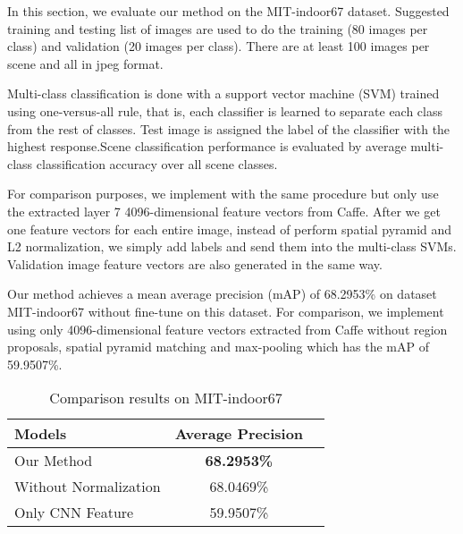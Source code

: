
In this section, we evaluate our method on the MIT-indoor67 dataset. Suggested training and
testing list of images are used to do the training (80 images per class)
and validation (20 images per class). There are at least 100 images per
scene and all in jpeg format.

Multi-class classification is done with a support vector machine (SVM) trained
using one-versus-all rule, that is, each classifier is learned to separate each
class from the rest of classes. Test image is assigned the label of the
classifier with the highest response.Scene classification performance is
evaluated by average multi-class classification accuracy over all scene classes.

For comparison purposes, we implement with the same procedure but only use
the extracted layer 7 4096-dimensional feature vectors from Caffe. After we get
one feature vectors for each entire image, instead of perform spatial pyramid
and L2 normalization, we simply add labels and send them into the multi-class
SVMs. Validation image feature vectors are also generated in the same way.

Our
method achieves a mean average precision (mAP) of 68.2953\% on dataset
MIT-indoor67\cite{Quattoni:2009:RIS} without fine-tune on this dataset.
For comparison, we implement using only 4096-dimensional feature vectors
extracted from Caffe without region proposals, spatial pyramid matching 
and max-pooling which has the mAP of 59.9507\%.

\begin{table}[ht]
	\caption{Comparison results on MIT-indoor67}
	\centering
	\begin{tabular}{l c c}
	\hline \hline
	Models                & Average Precision \\ \hline
	Our Method  	      & {\bf{68.2953\%}} \\
	Without Normalization & 68.0469\% \\
        Only CNN Feature      & 59.9507\% \\
	\hline
	\end{tabular}
	\label{tab:overall}
\end{table}

